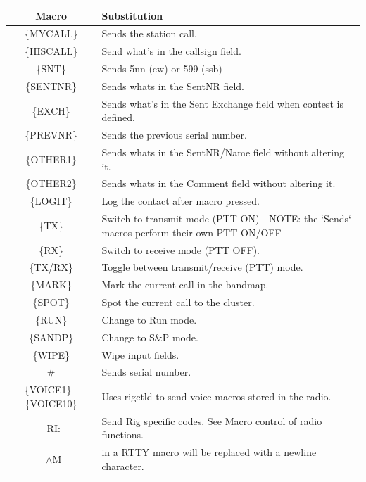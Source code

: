 \documentclass{article}
\begin{document}
\vspace{0.5cm}
\begin{tabular}{| c | p{9cm} |}
    \hline
    \textbf{Macro} & \textbf{Substitution} \\
    \hline
    \{MYCALL\} & Sends the station call. \\
    \hline
    \{HISCALL\} & Send what's in the callsign field. \\
    \hline
    \{SNT\} & Sends 5nn (cw) or 599 (ssb) \\
    \hline
    \{SENTNR\} & Sends whats in the SentNR field. \\
    \hline
    \{EXCH\} & Sends what's in the Sent Exchange field when contest is defined. \\
    \hline
    \{PREVNR\} & Sends the previous serial number. \\
    \hline
    \{OTHER1\} & Sends whats in the SentNR/Name field without altering it. \\
    \hline
    \{OTHER2\} & Sends whats in the Comment field without altering it. \\
    \hline
    \{LOGIT\} & Log the contact after macro pressed. \\
    \hline
    \{TX\} & Switch to transmit mode (PTT ON) - NOTE: the `Sends` macros perform their own PTT ON/OFF \\
    \hline
    \{RX\} & Switch to receive mode (PTT OFF). \\
    \hline
    \{TX/RX\} & Toggle between transmit/receive (PTT) mode. \\
    \hline
    \{MARK\} & Mark the current call in the bandmap. \\
    \hline
    \{SPOT\} & Spot the current call to the cluster. \\
    \hline
    \{RUN\} & Change to Run mode. \\
    \hline
    \{SANDP\} & Change to S\&P mode. \\
    \hline
    \{WIPE\} & Wipe input fields. \\
    \hline
    \# & Sends serial number. \\
    \hline
    \{VOICE1\} - \{VOICE10\} & Uses rigctld to send voice macros stored in the radio. \\
    \hline
    \ RI: & Send Rig specific codes. See Macro control of radio functions. \\
    \hline
    \ $\wedge$M & 	in a RTTY macro will be replaced with a newline character. \\
    \hline
\end{tabular}
\end{document}
